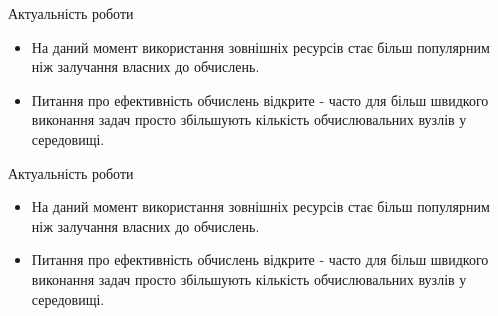 \begin{frame}{Актуальність роботи}
	\manimate
	
	\begin{itemize}
		\item На даний момент використання зовнішніх ресурсів стає більш популярним ніж залучання власних до обчислень.
		\item Питання про ефективність обчислень відкрите - часто для більш швидкого виконання задач просто збільшують кількість обчислювальних вузлів у середовищі.
	\end{itemize}
\end{frame}

\begin{frame}{Актуальність роботи}
\manimate

\begin{itemize}
	\item На даний момент використання зовнішніх ресурсів стає більш популярним ніж залучання власних до обчислень.
	\item Питання про ефективність обчислень відкрите - часто для більш швидкого виконання задач просто збільшують кількість обчислювальних вузлів у середовищі.
\end{itemize}
\end{frame}


